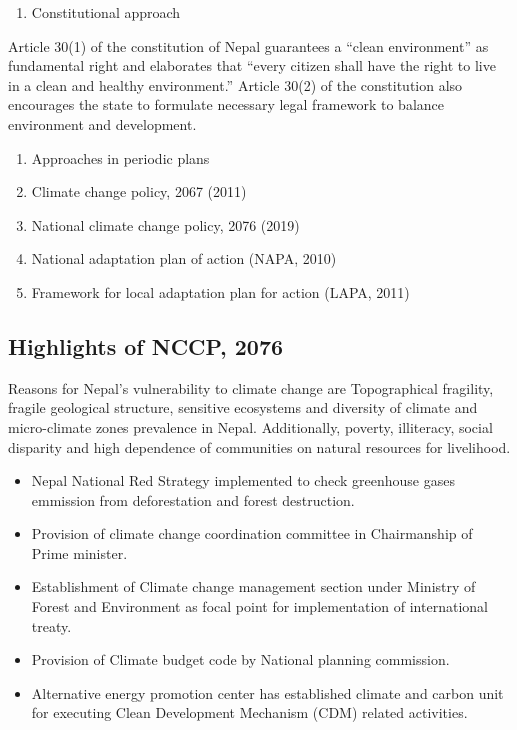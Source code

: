 \documentclass[
  openany]{book}
\providecommand{\tightlist}{%
  \setlength{\itemsep}{0pt}\setlength{\parskip}{0pt}}
\begin{document}
\begin{enumerate}
\def\labelenumi{\arabic{enumi}.}
\tightlist
\item
  Constitutional approach
\end{enumerate}

Article 30(1) of the constitution of Nepal guarantees a ``clean environment'' as fundamental right and elaborates that ``every citizen shall have the right to live in a clean and healthy environment.'' Article 30(2) of the constitution also encourages the state to formulate necessary legal framework to balance environment and development.

\begin{enumerate}
\def\labelenumi{\arabic{enumi}.}
\setcounter{enumi}{1}
\tightlist
\item
  Approaches in periodic plans
\item
  Climate change policy, 2067 (2011)
\item
  National climate change policy, 2076 (2019)
\item
  National adaptation plan of action (NAPA, 2010)
\item
  Framework for local adaptation plan for action (LAPA, 2011)
\end{enumerate}

\hypertarget{highlights-of-nccp-2076}{%
\subsection{Highlights of NCCP, 2076}\label{highlights-of-nccp-2076}}

Reasons for Nepal's vulnerability to climate change are Topographical fragility, fragile geological structure, sensitive ecosystems and diversity of climate and micro-climate zones prevalence in Nepal. Additionally, poverty, illiteracy, social disparity and high dependence of communities on natural resources for livelihood.

\begin{itemize}
\tightlist
\item
  Nepal National Red Strategy implemented to check greenhouse gases emmission from deforestation and forest destruction.
\item
  Provision of climate change coordination committee in Chairmanship of Prime minister.
\item
  Establishment of Climate change management section under Ministry of Forest and Environment as focal point for implementation of international treaty.
\item
  Provision of Climate budget code by National planning commission.
\item
  Alternative energy promotion center has established climate and carbon unit for executing Clean Development Mechanism (CDM) related activities.
\end{itemize}
\end{document}
